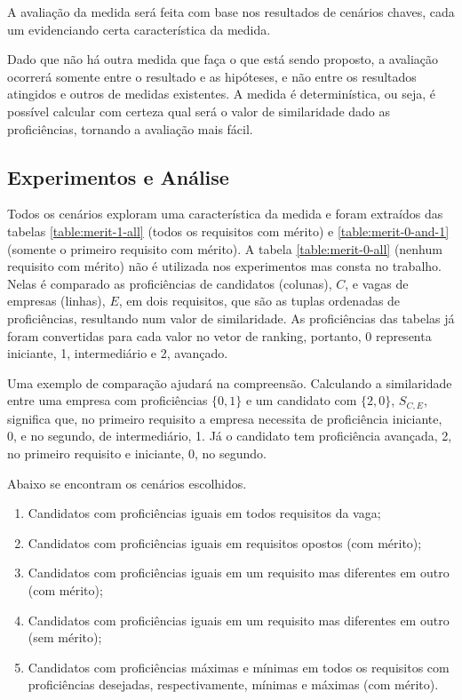 \documentclass[preprint,12pt]{elsarticle}
\begin{document}
A avaliação da medida será feita com base nos resultados de cenários chaves, cada um evidenciando certa característica da medida. 

Dado que não há outra medida que faça o que está sendo proposto, a avaliação ocorrerá somente entre o resultado e as hipóteses, e não entre os resultados atingidos e outros de medidas existentes. A medida é determinística, ou seja, é possível calcular com certeza qual será o valor de similaridade dado as proficiências, tornando a avaliação mais fácil.

\subsection{Experimentos e Análise}
\label{ssec:experiments}

Todos os cenários exploram uma característica da medida e foram extraídos das tabelas \ref{table:merit-1-all} (todos os requisitos com mérito) e \ref{table:merit-0-and-1} (somente o primeiro requisito com mérito). A tabela \ref{table:merit-0-all} (nenhum requisito com mérito) não é utilizada nos experimentos mas consta no trabalho. Nelas é comparado as proficiências de candidatos (colunas), $C$, e vagas de empresas (linhas), $E$, em dois requisitos, que são as tuplas ordenadas de proficiências, resultando num valor de similaridade. As proficiências das tabelas já foram convertidas para cada valor no vetor de ranking, portanto, 0 representa iniciante, 1, intermediário e 2, avançado. 

Uma exemplo de comparação ajudará na compreensão. Calculando a similaridade entre uma empresa com proficiências $\{0, 1\}$ e um candidato com $\{2, 0\}$, $ S_{C,E}$, significa que, no primeiro requisito a empresa necessita de proficiência iniciante, 0, e no segundo, de intermediário, 1. Já o candidato tem proficiência avançada, 2, no primeiro requisito e iniciante, 0, no segundo. 

Abaixo se encontram os cenários escolhidos.

\begin{enumerate}
    \item Candidatos com proficiências iguais em todos requisitos da vaga;
    \item Candidatos com proficiências iguais em requisitos opostos (com mérito);
    \item Candidatos com proficiências iguais em um requisito mas diferentes em outro (com mérito);
    \item Candidatos com proficiências iguais em um requisito mas diferentes em outro (sem mérito);
    \item Candidatos com proficiências máximas e mínimas em todos os requisitos com proficiências desejadas, respectivamente, mínimas e máximas (com mérito).
\end{enumerate}
\end{document}
